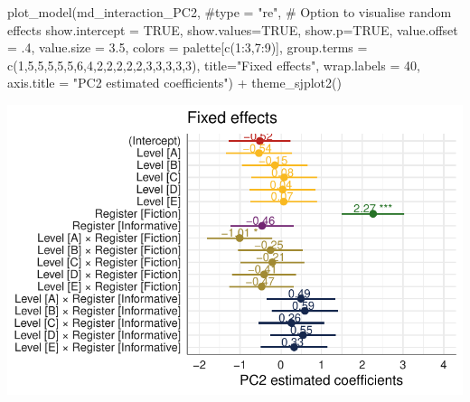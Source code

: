 \documentclass[
  letterpaper,
  DIV=11,
  numbers=noendperiod]{scrreprt}
\newenvironment{Shaded}{\begin{snugshade}}{\end{snugshade}}
\newcommand{\AttributeTok}[1]{\textcolor[rgb]{0.40,0.45,0.13}{#1}}
\newcommand{\CommentTok}[1]{\textcolor[rgb]{0.37,0.37,0.37}{#1}}
\newcommand{\ConstantTok}[1]{\textcolor[rgb]{0.56,0.35,0.01}{#1}}
\newcommand{\DecValTok}[1]{\textcolor[rgb]{0.68,0.00,0.00}{#1}}
\newcommand{\FloatTok}[1]{\textcolor[rgb]{0.68,0.00,0.00}{#1}}
\newcommand{\FunctionTok}[1]{\textcolor[rgb]{0.28,0.35,0.67}{#1}}
\newcommand{\NormalTok}[1]{\textcolor[rgb]{0.00,0.23,0.31}{#1}}
\newcommand{\SpecialCharTok}[1]{\textcolor[rgb]{0.37,0.37,0.37}{#1}}
\newcommand{\StringTok}[1]{\textcolor[rgb]{0.13,0.47,0.30}{#1}}
\begin{document}
\begin{Shaded}
\begin{Highlighting}[]
\FunctionTok{plot\_model}\NormalTok{(md\_interaction\_PC2, }
           \CommentTok{\#type = "re", \# Option to visualise random effects }
           \AttributeTok{show.intercept =} \ConstantTok{TRUE}\NormalTok{,}
           \AttributeTok{show.values=}\ConstantTok{TRUE}\NormalTok{, }
           \AttributeTok{show.p=}\ConstantTok{TRUE}\NormalTok{,}
           \AttributeTok{value.offset =}\NormalTok{ .}\DecValTok{4}\NormalTok{,}
           \AttributeTok{value.size =} \FloatTok{3.5}\NormalTok{,}
           \AttributeTok{colors =}\NormalTok{ palette[}\FunctionTok{c}\NormalTok{(}\DecValTok{1}\SpecialCharTok{:}\DecValTok{3}\NormalTok{,}\DecValTok{7}\SpecialCharTok{:}\DecValTok{9}\NormalTok{)],}
           \AttributeTok{group.terms =} \FunctionTok{c}\NormalTok{(}\DecValTok{1}\NormalTok{,}\DecValTok{5}\NormalTok{,}\DecValTok{5}\NormalTok{,}\DecValTok{5}\NormalTok{,}\DecValTok{5}\NormalTok{,}\DecValTok{5}\NormalTok{,}\DecValTok{6}\NormalTok{,}\DecValTok{4}\NormalTok{,}\DecValTok{2}\NormalTok{,}\DecValTok{2}\NormalTok{,}\DecValTok{2}\NormalTok{,}\DecValTok{2}\NormalTok{,}\DecValTok{2}\NormalTok{,}\DecValTok{3}\NormalTok{,}\DecValTok{3}\NormalTok{,}\DecValTok{3}\NormalTok{,}\DecValTok{3}\NormalTok{,}\DecValTok{3}\NormalTok{), }
           \AttributeTok{title=}\StringTok{"Fixed effects"}\NormalTok{,}
           \AttributeTok{wrap.labels =} \DecValTok{40}\NormalTok{,}
           \AttributeTok{axis.title =} \StringTok{"PC2 estimated coefficients"}\NormalTok{) }\SpecialCharTok{+}
  \FunctionTok{theme\_sjplot2}\NormalTok{() }
\end{Highlighting}
\end{Shaded}

\includegraphics{G_Ch7_Analysis_files/figure-pdf/Dim2fixed-1.pdf}
\end{document}
